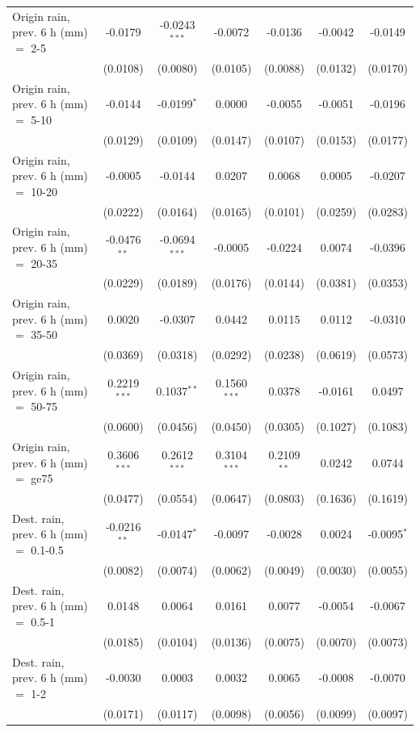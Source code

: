 \begin{tabular}{lcccccc}
   Origin rain, prev. 6 h (mm) $=$ 2-5 & -0.0179 & -0.0243$^{***}$ & -0.0072 & -0.0136 & -0.0042 & -0.0149\\
    & (0.0108) & (0.0080) & (0.0105) & (0.0088) & (0.0132) & (0.0170)\\
   Origin rain, prev. 6 h (mm) $=$ 5-10 & -0.0144 & -0.0199$^{*}$ & 0.0000 & -0.0055 & -0.0051 & -0.0196\\
    & (0.0129) & (0.0109) & (0.0147) & (0.0107) & (0.0153) & (0.0177)\\
   Origin rain, prev. 6 h (mm) $=$ 10-20 & -0.0005 & -0.0144 & 0.0207 & 0.0068 & 0.0005 & -0.0207\\
    & (0.0222) & (0.0164) & (0.0165) & (0.0101) & (0.0259) & (0.0283)\\
   Origin rain, prev. 6 h (mm) $=$ 20-35 & -0.0476$^{**}$ & -0.0694$^{***}$ & -0.0005 & -0.0224 & 0.0074 & -0.0396\\
    & (0.0229) & (0.0189) & (0.0176) & (0.0144) & (0.0381) & (0.0353)\\
   Origin rain, prev. 6 h (mm) $=$ 35-50 & 0.0020 & -0.0307 & 0.0442 & 0.0115 & 0.0112 & -0.0310\\
    & (0.0369) & (0.0318) & (0.0292) & (0.0238) & (0.0619) & (0.0573)\\
   Origin rain, prev. 6 h (mm) $=$ 50-75 & 0.2219$^{***}$ & 0.1037$^{**}$ & 0.1560$^{***}$ & 0.0378 & -0.0161 & 0.0497\\
    & (0.0600) & (0.0456) & (0.0450) & (0.0305) & (0.1027) & (0.1083)\\
   Origin rain, prev. 6 h (mm) $=$ ge75 & 0.3606$^{***}$ & 0.2612$^{***}$ & 0.3104$^{***}$ & 0.2109$^{**}$ & 0.0242 & 0.0744\\
    & (0.0477) & (0.0554) & (0.0647) & (0.0803) & (0.1636) & (0.1619)\\
   Dest. rain, prev. 6 h (mm) $=$ 0.1-0.5 & -0.0216$^{**}$ & -0.0147$^{*}$ & -0.0097 & -0.0028 & 0.0024 & -0.0095$^{*}$\\
    & (0.0082) & (0.0074) & (0.0062) & (0.0049) & (0.0030) & (0.0055)\\
   Dest. rain, prev. 6 h (mm) $=$ 0.5-1 & 0.0148 & 0.0064 & 0.0161 & 0.0077 & -0.0054 & -0.0067\\
    & (0.0185) & (0.0104) & (0.0136) & (0.0075) & (0.0070) & (0.0073)\\
   Dest. rain, prev. 6 h (mm) $=$ 1-2 & -0.0030 & 0.0003 & 0.0032 & 0.0065 & -0.0008 & -0.0070\\
    & (0.0171) & (0.0117) & (0.0098) & (0.0056) & (0.0099) & (0.0097)\\

\end{tabular}
